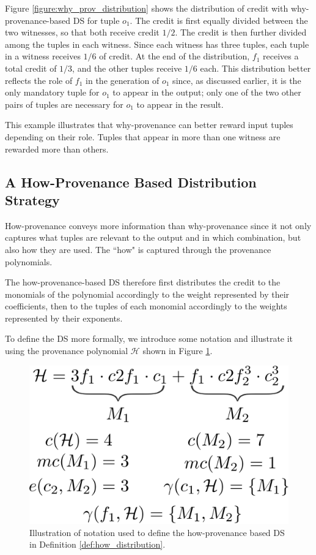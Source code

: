 Figure \ref{figure:why_prov_distribution} shows the distribution of credit with why-provenance-based DS for tuple $o_1$.
The credit is first equally divided between the two witnesses, so that both receive credit $1/2$. 
The credit is then further divided among the tuples in each witness. Since each witness has three tuples, each tuple in a witness receives $1/6$ of credit. At the end of the distribution, $f_1$ receives a total credit of $1/3$, and the other tuples receive $1/6$ each.
This distribution better reflects the role of $f_1$ in the generation of $o_1$ since, as discussed earlier, it is the only mandatory tuple for $o_1$ to appear in the output; only one of the two other pairs of tuples are necessary for $o_1$ to appear in the result. 

This example illustrates that why-provenance can better reward input tuples depending on their role. Tuples that appear in more than one witness are rewarded more than others. 

\subsection{A How-Provenance Based Distribution Strategy}
\label{section:how_prov_distr_tuples}


How-provenance conveys more information than why-provenance since it not only captures what tuples are relevant to the output and in which combination, but also how they are used. The ``how" is captured through the provenance polynomials.

The how-provenance-based DS therefore first distributes the credit to the monomials of the polynomial accordingly to the weight represented by their coefficients, then to the tuples of each monomial accordingly to the weights represented by their exponents. 

To define the DS more formally, we introduce some notation and illustrate it using the provenance polynomial $\mathcal{H}$ shown in Figure \ref{figure:how_example}. 


\begin{figure}[]
\centering
  \includegraphics[width=.5\textwidth]{figures/how_example}
  \caption{Illustration of notation used to define the how-provenance based DS in Definition \ref{def:how_distribution}.}
  \label{figure:how_example}
\end{figure}

